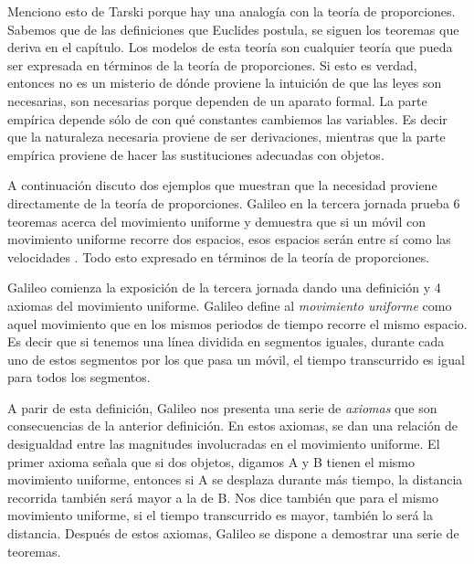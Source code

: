 Menciono esto de Tarski porque hay una analogía con la teoría de proporciones. Sabemos que de las definiciones que Euclides postula, se siguen los teoremas que deriva en el capítulo. Los modelos de esta teoría son cualquier teoría que pueda ser expresada en términos de la teoría de proporciones. Si esto es verdad, entonces no es un misterio de dónde proviene la intuición de que las leyes son necesarias, son necesarias porque dependen de un aparato formal. La parte empírica depende sólo de con qué constantes cambiemos las variables. Es decir que la naturaleza necesaria proviene de ser derivaciones, mientras que la parte empírica proviene de hacer las sustituciones adecuadas con objetos.

A continuación discuto dos ejemplos que muestran que la necesidad proviene directamente de la teoría de proporciones. Galileo en la tercera jornada prueba 6 teoremas acerca del movimiento uniforme y demuestra que si un móvil con movimiento uniforme recorre dos espacios, esos espacios serán entre sí como las velocidades \cite[p. 215]{galtre}. Todo esto expresado en términos de la teoría de proporciones.

Galileo comienza la exposición de la tercera jornada dando una definición y 4 axiomas del movimiento uniforme. Galileo define al \textit{movimiento uniforme} como aquel movimiento que en los mismos periodos de tiempo recorre el mismo espacio. Es decir que si tenemos una línea dividida en segmentos iguales, durante cada uno de estos segmentos por los que pasa un móvil, el tiempo transcurrido es igual para todos los segmentos.

A parir de esta definición, Galileo nos presenta una serie de \textit{axiomas} que son consecuencias de la anterior definición. En estos axiomas, se dan una relación de desigualdad entre las magnitudes involucradas en el movimiento uniforme. El primer axioma señala que si dos objetos, digamos A y B tienen el mismo movimiento uniforme, entonces si A se desplaza durante más tiempo, la distancia recorrida también será mayor a la de B. Nos dice también que para el mismo movimiento uniforme, si el tiempo transcurrido es mayor, también lo será la distancia. Después de estos axiomas, Galileo se dispone a demostrar una serie de teoremas.

